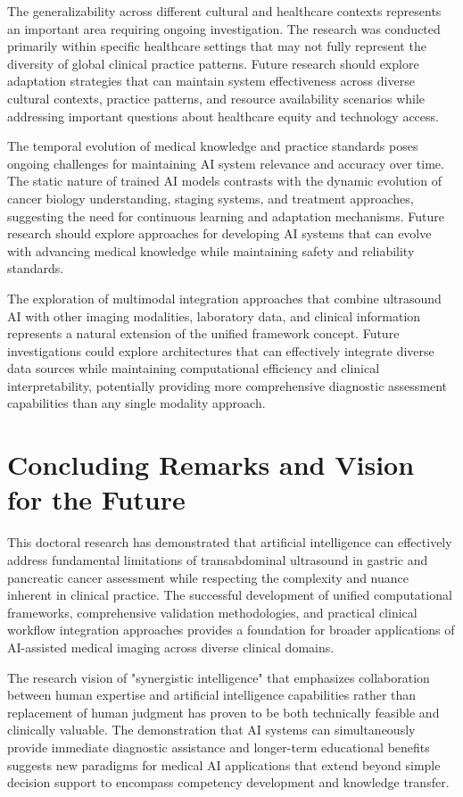 The generalizability across different cultural and healthcare contexts represents an important area requiring ongoing investigation. The research was conducted primarily within specific healthcare settings that may not fully represent the diversity of global clinical practice patterns. Future research should explore adaptation strategies that can maintain system effectiveness across diverse cultural contexts, practice patterns, and resource availability scenarios while addressing important questions about healthcare equity and technology access.

The temporal evolution of medical knowledge and practice standards poses ongoing challenges for maintaining AI system relevance and accuracy over time. The static nature of trained AI models contrasts with the dynamic evolution of cancer biology understanding, staging systems, and treatment approaches, suggesting the need for continuous learning and adaptation mechanisms. Future research should explore approaches for developing AI systems that can evolve with advancing medical knowledge while maintaining safety and reliability standards.

The exploration of multimodal integration approaches that combine ultrasound AI with other imaging modalities, laboratory data, and clinical information represents a natural extension of the unified framework concept. Future investigations could explore architectures that can effectively integrate diverse data sources while maintaining computational efficiency and clinical interpretability, potentially providing more comprehensive diagnostic assessment capabilities than any single modality approach.

\section{Concluding Remarks and Vision for the Future}

This doctoral research has demonstrated that artificial intelligence can effectively address fundamental limitations of transabdominal ultrasound in gastric and pancreatic cancer assessment while respecting the complexity and nuance inherent in clinical practice. The successful development of unified computational frameworks, comprehensive validation methodologies, and practical clinical workflow integration approaches provides a foundation for broader applications of AI-assisted medical imaging across diverse clinical domains.

The research vision of "synergistic intelligence" that emphasizes collaboration between human expertise and artificial intelligence capabilities rather than replacement of human judgment has proven to be both technically feasible and clinically valuable. The demonstration that AI systems can simultaneously provide immediate diagnostic assistance and longer-term educational benefits suggests new paradigms for medical AI applications that extend beyond simple decision support to encompass competency development and knowledge transfer.

